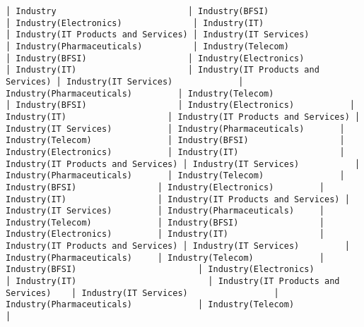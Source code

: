 \documentclass[11pt]{article}
\begin{document}
\begin{Verbatim}[commandchars=\\\{\}]
│ Industry                          │ Industry(BFSI)                     │ Industry(Electronics)              │ Industry(IT)                       │ Industry(IT Products and Services) │ Industry(IT Services)              │ Industry(Pharmaceuticals)          │ Industry(Telecom)                  │ Industry(BFSI)                    │ Industry(Electronics)             │ Industry(IT)                      │ Industry(IT Products and Services) │ Industry(IT Services)             │ Industry(Pharmaceuticals)         │ Industry(Telecom)                 │ Industry(BFSI)                  │ Industry(Electronics)           │ Industry(IT)                    │ Industry(IT Products and Services) │ Industry(IT Services)           │ Industry(Pharmaceuticals)       │ Industry(Telecom)               │ Industry(BFSI)                  │ Industry(Electronics)           │ Industry(IT)                    │ Industry(IT Products and Services) │ Industry(IT Services)           │ Industry(Pharmaceuticals)       │ Industry(Telecom)               │ Industry(BFSI)                │ Industry(Electronics)         │ Industry(IT)                  │ Industry(IT Products and Services) │ Industry(IT Services)         │ Industry(Pharmaceuticals)     │ Industry(Telecom)             │ Industry(BFSI)                │ Industry(Electronics)         │ Industry(IT)                  │ Industry(IT Products and Services) │ Industry(IT Services)         │ Industry(Pharmaceuticals)     │ Industry(Telecom)             │ Industry(BFSI)                        │ Industry(Electronics)                 │ Industry(IT)                          │ Industry(IT Products and Services)    │ Industry(IT Services)                 │ Industry(Pharmaceuticals)             │ Industry(Telecom)                     │

\end{Verbatim}
\end{document}
